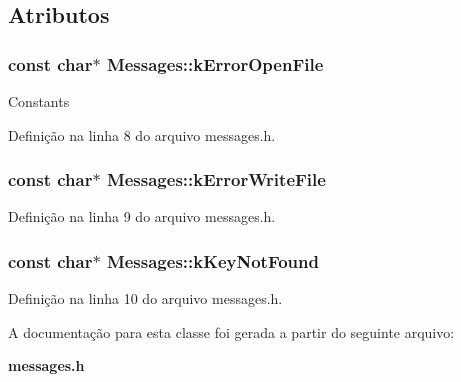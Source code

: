 \subsection{Atributos}
\subsubsection[{k\+Error\+Open\+File}]{\setlength{\rightskip}{0pt plus 5cm}const char$\ast$ Messages\+::k\+Error\+Open\+File\hspace{0.3cm}{\ttfamily [static]}}\label{class_messages_a78621bc05d4cd3ba136a68129df4f46a}
Constants 

Definição na linha 8 do arquivo messages.\+h.

\subsubsection[{k\+Error\+Write\+File}]{\setlength{\rightskip}{0pt plus 5cm}const char$\ast$ Messages\+::k\+Error\+Write\+File\hspace{0.3cm}{\ttfamily [static]}}\label{class_messages_a6709895c6dfc49398eb6c69f96aea8ca}


Definição na linha 9 do arquivo messages.\+h.

\subsubsection[{k\+Key\+Not\+Found}]{\setlength{\rightskip}{0pt plus 5cm}const char$\ast$ Messages\+::k\+Key\+Not\+Found\hspace{0.3cm}{\ttfamily [static]}}\label{class_messages_a5b3bc4176f070da016d43a4593a4f83b}


Definição na linha 10 do arquivo messages.\+h.



A documentação para esta classe foi gerada a partir do seguinte arquivo\+:\begin{DoxyCompactItemize}
\item 
{\bf messages.\+h}\end{DoxyCompactItemize}
